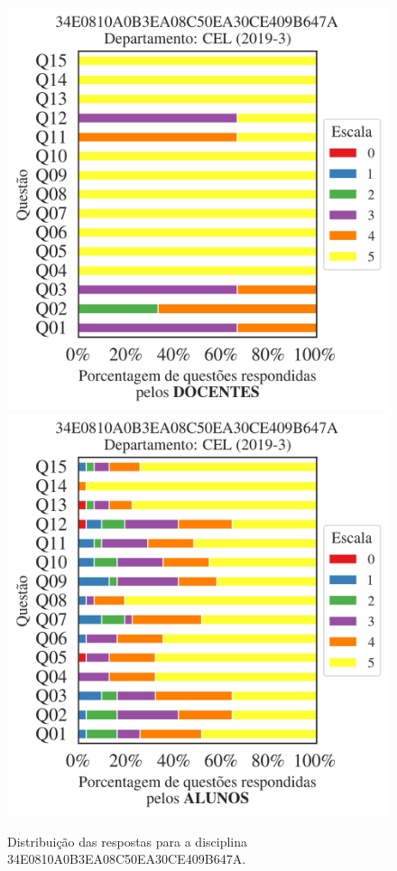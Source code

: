 \documentclass[a4paper,10pt]{article}
\begin{document}
\begin{figure}[h]
\centering
\includegraphics[width=0.485\linewidth]{analise_disciplina_departamento_CEL_34E0810A0B3EA08C50EA30CE409B647A_docentes.png}
\includegraphics[width=0.485\linewidth]{analise_disciplina_departamento_CEL_34E0810A0B3EA08C50EA30CE409B647A_alunos.png}
\caption{\label{fig:analise_geral_departamento}                Distribuição das respostas para a disciplina 34E0810A0B3EA08C50EA30CE409B647A. }
\end{figure}
\end{document}
